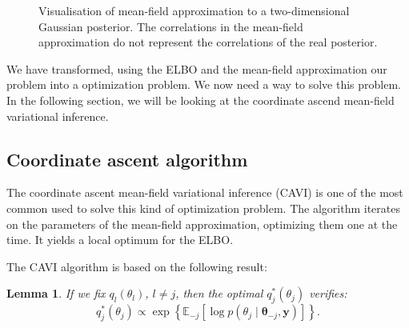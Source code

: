 \documentclass{article}
\numberwithin{equation}{section}
\newtheorem{lemma}{Lemma}[section]
\begin{document}
\begin{figure}[h!]
\centering
{}
\caption{\label{fig:mean_field}Visualisation of mean-field approximation to a two-dimensional Gaussian posterior. The correlations in the mean-field approximation do not represent the correlations of the real posterior.}
\end{figure}

We have transformed, using the \small{ELBO} and the mean-field approximation our problem into a optimization problem. We now need a way to solve this problem. In the following section, we will be looking at the coordinate ascend mean-field variational inference.
\subsection{Coordinate ascent algorithm}
The coordinate ascent mean-field variational inference (\small{CAVI}) is one of the most common used to solve this kind of optimization problem. The algorithm iterates on the parameters of the mean-field approximation, optimizing them one at the time. It yields a local optimum for the \small{ELBO}.

The \small{CAVI} algorithm is based on the following result:
\begin{lemma}

If we fix $q_l(\theta_l)$, $l\neq j$, then the optimal $q^*_j(\theta_j)$ verifies:
\begin{equation*}
q^*_j(\theta_j) \propto \exp\left\lbrace\mathbb{E}_{-j}\left[\log p(\theta_j \mid \boldsymbol{\theta}_{-j}, \boldsymbol{y})\right]\right\rbrace.
\end{equation*}

\end{lemma}
\end{document}
